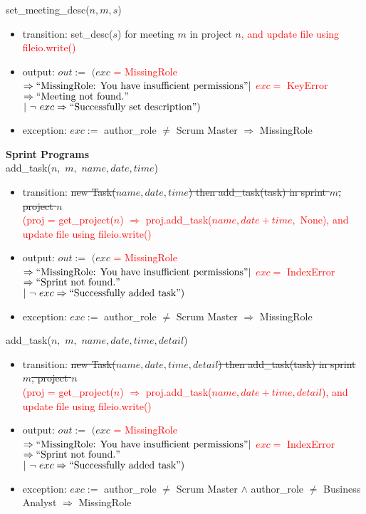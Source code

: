 \documentclass[12pt, titlepage]{article}
\begin{document}
\noindent set\_meeting\_desc($n, m, s$)
\begin{itemize}
    \item transition: set\_desc($s$) for meeting $m$ in project $n$\textcolor{red}{, and update file using fileio.write()}
    \item output: $out :=$ $(exc$ \textcolor{red}{= MissingRole} $\Rightarrow ``\text{MissingRole: You have insufficient permissions}"\\ |\ $\textcolor{red}{$exc =$ KeyError $\Rightarrow ``\text{Meeting not found.}"$}\\$|\ \lnot\ exc \Rightarrow ``\text{Successfully set description}")$
    \item exception: $exc :=$ author\_role $\neq$ Scrum Master $\Rightarrow$ MissingRole
\end{itemize}

\noindent \textbf{Sprint Programs\\}
\noindent add\_task($n,$ \sout{$m,$} $name, date, time$)
\begin{itemize}
    \item transition: \sout{new Task($name, date, time$) then add\_task(task) in sprint $m$, project $n$}\\\textcolor{red}{(proj = get\_project($n$) $\Rightarrow$ proj.add\_task($name, date + time,$ None)}\textcolor{red}{, and update file using fileio.write()}
    \item output: $out :=$ $(exc$ \textcolor{red}{= MissingRole} $\Rightarrow ``\text{MissingRole: You have insufficient permissions}"\\ |\ $\textcolor{red}{$exc =$ IndexError $\Rightarrow ``\text{Sprint not found.}"$}\\$|\ \lnot\ exc \Rightarrow ``\text{Successfully added task}")$
    \item exception: $exc :=$ author\_role $\neq$ Scrum Master $\Rightarrow$ MissingRole
\end{itemize}

\noindent add\_task($n,$ \sout{$m,$} $name, date, time, detail$)
\begin{itemize}
    \item transition: \sout{new Task($name, date, time, detail$) then add\_task(task) in sprint $m$, project $n$}\\\textcolor{red}{(proj = get\_project($n$) $\Rightarrow$ proj.add\_task($name, date + time, detail$)}\textcolor{red}{, and update file using fileio.write()}
    \item output: $out :=$ $(exc$ \textcolor{red}{= MissingRole} $\Rightarrow ``\text{MissingRole: You have insufficient permissions}"\\ |\ $\textcolor{red}{$exc =$ IndexError $\Rightarrow ``\text{Sprint not found.}"$}\\$|\ \lnot\ exc \Rightarrow ``\text{Successfully added task}")$
    \item exception: $exc :=$ author\_role $\neq$ Scrum Master $\land$ author\_role $\neq$ Business Analyst $\Rightarrow$ MissingRole
\end{itemize}
\end{document}
